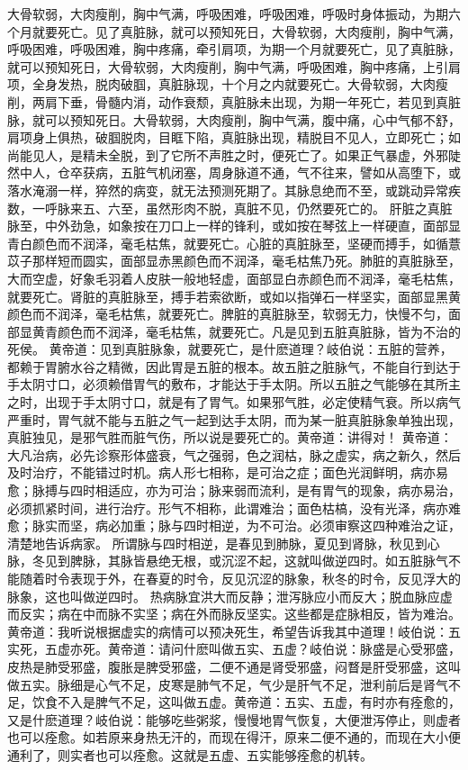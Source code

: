 \documentclass[a4paper,12pt,UTF8,twoside]{ctexbook}
\begin{document}
大骨软弱，大肉瘦削，胸中气满，呼吸困难，呼吸困难，呼吸时身体振动，为期六个月就要死亡。见了真脏脉，就可以预知死日，大骨软弱，大肉瘦削，胸中气满，呼吸困难，呼吸困难，胸中疼痛，牵引肩项，为期一个月就要死亡，见了真脏脉，就可以预知死日，大骨软弱，大肉瘦削，胸中气满，呼吸困难，胸中疼痛，上引肩项，全身发热，脱肉破腘，真脏脉现，十个月之内就要死亡。大骨软弱，大肉瘦削，两肩下垂，骨髓内消，动作衰颓，真脏脉未出现，为期一年死亡，若见到真脏脉，就可以预知死日。大骨软弱，大肉瘦削，胸中气满，腹中痛，心中气郁不舒，肩项身上俱热，破腘脱肉，目眶下陷，真脏脉出现，精脱目不见人，立即死亡；如尚能见人，是精未全脱，到了它所不声胜之时，便死亡了。如果正气暴虚，外邪陡然中人，仓卒获病，五脏气机闭塞，周身脉道不通，气不往来，譬如从高堕下，或落水淹溺一样，猝然的病变，就无法预测死期了。其脉息绝而不至，或跳动异常疾数，一呼脉来五、六至，虽然形肉不脱，真脏不见，仍然要死亡的。
肝脏之真脏脉至，中外劲急，如象按在刀口上一样的锋利，或如按在琴弦上一样硬直，面部显青白颜色而不润泽，毫毛枯焦，就要死亡。心脏的真脏脉至，坚硬而搏手，如循薏苡子那样短而圆实，面部显赤黑颜色而不润泽，毫毛枯焦乃死。肺脏的真脏脉至，大而空虚，好象毛羽着人皮肤一般地轻虚，面部显白赤颜色而不润泽，毫毛枯焦，就要死亡。肾脏的真脏脉至，搏手若索欲断，或如以指弹石一样坚实，面部显黑黄颜色而不润泽，毫毛枯焦，就要死亡。脾脏的真脏脉至，软弱无力，快慢不匀，面部显黄青颜色而不润泽，毫毛枯焦，就要死亡。凡是见到五脏真脏脉，皆为不治的死侯。
黄帝道：见到真脏脉象，就要死亡，是什麽道理？岐伯说：五脏的营养，都赖于胃腑水谷之精微，因此胃是五脏的根本。故五脏之脏脉气，不能自行到达于手太阴寸口，必须赖借胃气的敷布，才能达于手太阴。所以五脏之气能够在其所主之时，出现于手太阴寸口，就是有了胃气。如果邪气胜，必定使精气衰。所以病气严重时，胃气就不能与五脏之气一起到达手太阴，而为某一脏真脏脉象单独出现，真脏独见，是邪气胜而脏气伤，所以说是要死亡的。黄帝道：讲得对！
黄帝道：大凡治病，必先诊察形体盛衰，气之强弱，色之润枯，脉之虚实，病之新久，然后及时治疗，不能错过时机。病人形七相称，是可治之症；面色光润鲜明，病亦易愈；脉搏与四时相适应，亦为可治；脉来弱而流利，是有胃气的现象，病亦易治，必须抓紧时间，进行治疗。形气不相称，此谓难治；面色枯槁，没有光泽，病亦难愈；脉实而坚，病必加重；脉与四时相逆，为不可治。必须审察这四种难治之证，清楚地告诉病家。
所谓脉与四时相逆，是春见到肺脉，夏见到肾脉，秋见到心脉，冬见到脾脉，其脉皆悬绝无根，或沉涩不起，这就叫做逆四时。如五脏脉气不能随着时令表现于外，在春夏的时令，反见沉涩的脉象，秋冬的时令，反见浮大的脉象，这也叫做逆四时。
热病脉宜洪大而反静；泄泻脉应小而反大；脱血脉应虚而反实；病在中而脉不实坚；病在外而脉反坚实。这些都是症脉相反，皆为难治。
黄帝道：我听说根据虚实的病情可以预决死生，希望告诉我其中道理！岐伯说：五实死，五虚亦死。黄帝道：请问什麽叫做五实、五虚？岐伯说：脉盛是心受邪盛，皮热是肺受邪盛，腹胀是脾受邪盛，二便不通是肾受邪盛，闷瞀是肝受邪盛，这叫做五实。脉细是心气不足，皮寒是肺气不足，气少是肝气不足，泄利前后是肾气不足，饮食不入是脾气不足，这叫做五虚。黄帝道：五实、五虚，有时亦有痊愈的，又是什麽道理？岐伯说：能够吃些粥浆，慢慢地胃气恢复，大便泄泻停止，则虚者也可以痊愈。如若原来身热无汗的，而现在得汗，原来二便不通的，而现在大小便通利了，则实者也可以痊愈。这就是五虚、五实能够痊愈的机转。
\end{document}
